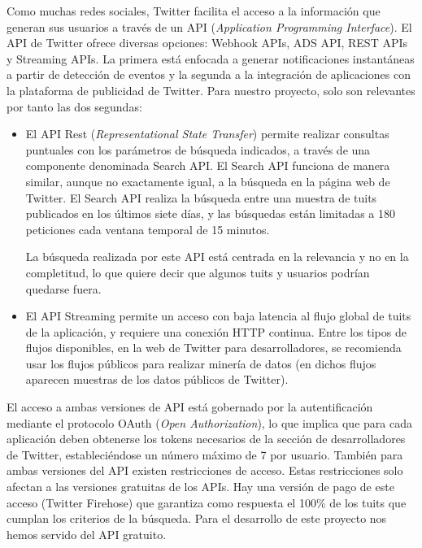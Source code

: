 Como muchas redes sociales, Twitter facilita el acceso a la información que generan sus 
usuarios a través de un
API ({\em Application Programming Interface})\cite{twitter_dev_web}. El API de Twitter ofrece diversas opciones: 
Webhook APIs, ADS API, REST APIs y Streaming APIs. La primera está enfocada a generar  
notificaciones instantáneas a partir de detección de eventos y la segunda a la integración de aplicaciones con la 
plataforma de publicidad de Twitter. Para nuestro proyecto, solo son relevantes por tanto las dos segundas:
\begin{itemize}
\item El API Rest ({\em Representational State Transfer}) permite realizar consultas puntuales con los parámetros de búsqueda indicados,
a través de una componente denominada Search API. El Search API funciona de manera similar, aunque no 
exactamente igual, a la búsqueda en la página web de Twitter. El Search API 
realiza la búsqueda entre una muestra de tuits publicados en los últimos siete días, y
las búsquedas están limitadas a 180 peticiones cada ventana temporal de 15 minutos. 


La búsqueda realizada por este API está centrada en la relevancia y no en la completitud, lo que 
quiere decir que algunos tuits y usuarios podrían quedarse fuera.

\item El API Streaming permite un acceso con baja latencia al flujo global de tuits de la aplicación,
y requiere una conexión HTTP continua. Entre los tipos de flujos disponibles, en la web de Twitter
para desarrolladores, se recomienda usar los flujos públicos para realizar minería de datos (en dichos flujos
aparecen muestras de los datos públicos de Twitter).


\end{itemize}

El acceso a ambas versiones de API está gobernado por la autentificación mediante el protocolo OAuth
({\em Open Authorization}), lo que implica que para cada aplicación deben obtenerse los tokens necesarios 
de la sección de desarrolladores de Twitter, estableciéndose un número máximo de 7 por usuario.
También para ambas versiones del API existen restricciones de acceso. Estas restricciones solo
afectan a las versiones gratuitas de los APIs. Hay una versión de pago de este acceso  (Twitter Firehose)
que garantiza como respuesta el 100\% de los tuits que cumplan los criterios de la búsqueda.
Para el desarrollo de este proyecto nos hemos servido del API gratuito. 

